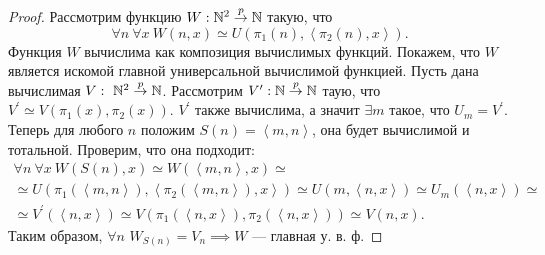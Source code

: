 \begin{proof}
    Рассмотрим функцию $W: \mathbb{N}^{2} \overset{p}{\to} \mathbb{N}$ такую, что 
    $$
    \forall n~\forall x~W\left(n, x\right) \simeq U\left(\pi_{1}\left(n\right), \left\langle \pi_{2}\left(n\right), x\right\rangle\right).
    $$
    Функция $W$ вычислима как композиция вычислимых функций.
    Покажем, что $W$ является искомой главной универсальной вычислимой функцией.
    Пусть дана вычислимая $V:~\mathbb{N}^{2} \overset{p}{\to} \mathbb{N}$.
    Рассмотрим $V^{\prime}: \mathbb{N} \overset{p}{\to} \mathbb{N}$ таую, что $V^{\prime} \simeq V\left(\pi_{1}\left(x\right), \pi_{2}\left(x\right)\right)$.
    $V^{\prime}$ также вычислима, а значит $\exists m$ такое, что $U_{m} = V^{\prime}$.
    Теперь для любого $n$ положим $S\left(n\right) = \left\langle m, n\right\rangle$, она будет вычислимой и тотальной.
    Проверим, что она подходит:
    \begin{multline}
        \forall n~\forall x~W\left(S\left(n\right), x\right) \simeq W\left(\left\langle m, n\right\rangle, x\right) \simeq \\ \simeq U\left(\pi_{1}\left(\left\langle m, n\right\rangle\right), \left\langle \pi_{2}\left(\left\langle m, n\right\rangle\right), x\right\rangle\right) \simeq U\left(m, \left\langle n, x\right\rangle\right) \simeq U_{m}\left(\left\langle n, x\right\rangle\right) \simeq \\ \simeq V^{\prime}\left(\left\langle n, x\right\rangle\right) \simeq V\left(\pi_{1}\left(\left\langle n, x\right\rangle\right), \pi_{2}\left(\left\langle n, x\right\rangle\right)\right) \simeq V\left(n, x\right).
    \end{multline}
    Таким образом, $\forall n$ $W_{S\left(n\right)} = V_{n} \implies W$ --- главная у. в. ф.
\end{proof}